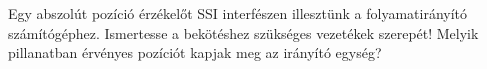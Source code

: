\begin{example}

Egy abszolút pozíció érzékelőt SSI interfészen illesztünk a folyamatirányító számítógéphez. Ismertesse a bekötéshez szükséges vezetékek szerepét! Melyik pillanatban érvényes pozíciót kapjak meg az irányító egység?

\tcbline
\vspace{1mm}

\solution

\end{example}